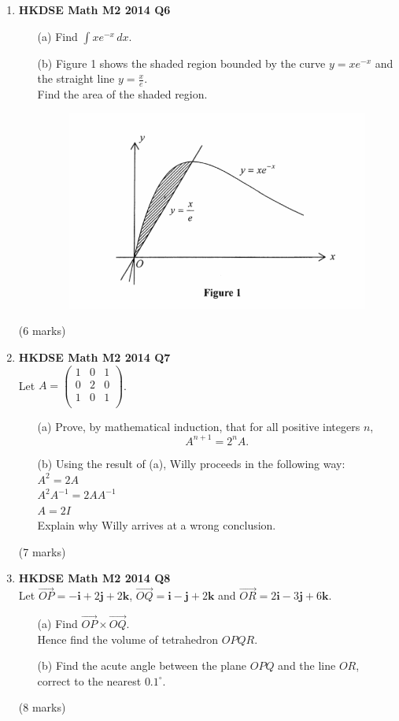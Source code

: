 \documentclass{report}
\begin{document}
\begin{enumerate}
	\item \textbf{HKDSE Math M2 2014 Q6}
	\begin{enumerate}
		\item [(a)]Find $\displaystyle\int xe^{-x}\,dx$. 
		\item [(b)]Figure 1 shows the shaded region bounded by the curve $y = xe^{-x}$ and the straight line $y = \displaystyle\frac{x}{e}$. \\
		Find the area of the shaded region.
		\begin{figure}[H]
			\centering
			\includegraphics[width = .5\linewidth]{2014Figure1}
		\end{figure}

	\end{enumerate}
	(6 marks)

	\item \textbf{HKDSE Math M2 2014 Q7}\\
	Let $A = \begin{pmatrix}
		1&0&1\\
		0&2&0\\
		1&0&1\\
	\end{pmatrix}$.
	\begin{enumerate}
		\item [(a)]Prove, by mathematical induction, that for all positive integers $n$, $$A^{n+1} = 2^nA.$$ 
		\item [(b)]Using the result of (a), Willy proceeds in the following way:\\
			$A^2 = 2A$\\
			$A^2 A^{-1}= 2AA^{-1}$\\
			$A = 2I$\\
			Explain why Willy arrives at a wrong conclusion.
	\end{enumerate}
	(7 marks)

	\item \textbf{HKDSE Math M2 2014 Q8}\\
	Let 
	$\overrightarrow{OP} = -\textbf{i} +2 \textbf{j} +2\textbf {k}$, 
	$\overrightarrow{OQ} = \textbf{i} - \textbf{j} +2\textbf {k}$ and 
	$\overrightarrow{OR} = 2\textbf{i} -3 \textbf{j} +6\textbf {k}$. 
	\begin{enumerate}
		\item [(a)]Find $\overrightarrow{OP} \times \overrightarrow{OQ}$. \\
		Hence find the volume of tetrahedron $OPQR$. 
		\item [(b)]Find the acute angle between the plane $OPQ$ and the line $OR$, \\
		correct to the nearest $0.1^\circ$.
	\end{enumerate}
	(8 marks)


\end{enumerate}
\end{document}

